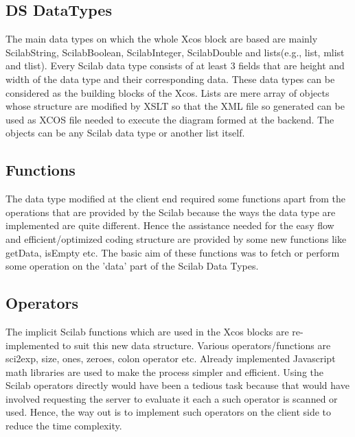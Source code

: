 \documentclass[conference]{IEEEtran}
\begin{document}
\subsection{DS DataTypes}
The main data types on which the whole Xcos block are based are mainly ScilabString, ScilabBoolean, ScilabInteger, ScilabDouble and lists(e.g., list, mlist and tlist). Every Scilab data type consists of at least 3 fields that are height and width of the data type and their corresponding data. 
These data types can be considered as the building blocks of the Xcos. Lists are mere array of objects whose structure are modified by XSLT so that the XML file so generated can be used as XCOS file needed to execute the diagram formed at the backend. The objects can be any Scilab data type or another list itself.

\subsection{Functions}
The data type modified at the client end required some functions apart from the operations that are provided by the Scilab because the ways the data type are implemented are quite different. Hence the assistance needed for the easy flow and efficient/optimized coding structure are provided by some new functions like getData, isEmpty etc. The basic aim of these functions was to fetch or perform some operation on the 'data' part of the Scilab Data Types.

\subsection{Operators}
The implicit Scilab functions which are used in the Xcos blocks are re-implemented to suit this new data structure. Various operators/functions are sci2exp, size, ones, zeroes, colon operator etc. Already implemented Javascript math libraries are used to make the process simpler and efficient. Using the Scilab operators directly would have been a tedious task because that would have involved requesting the server to evaluate it each a such operator is scanned or used. Hence, the way out is to implement such operators on the client side to reduce the time complexity.
\end{document}
